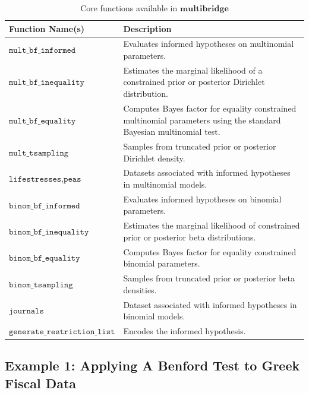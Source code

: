 \documentclass[
  english,
  man,floatsintext]{apa6}
\begin{document}
\begin{table}
\caption {Core functions available in $\textbf{multibridge}$}
\label{table:core_functions}
\begin{center}
\begin{tabular}{p{5.5cm}p{10.5cm}}
        \toprule
Function Name(s) & Description \\\midrule
$\texttt{mult\_bf\_informed}$ & Evaluates informed hypotheses on multinomial parameters.  \\
$\texttt{mult\_bf\_inequality}$ & Estimates the marginal likelihood of a constrained prior or posterior Dirichlet distribution.  \\
$\texttt{mult\_bf\_equality}$ & Computes Bayes factor for equality constrained multinomial parameters using the standard Bayesian multinomial test.  \\
$\texttt{mult\_tsampling}$ & Samples from truncated prior or posterior Dirichlet density.\\
$ \texttt{lifestresses}, \texttt{peas}$ & Datasets associated with informed hypotheses in multinomial models.\\\midrule
$\texttt{binom\_bf\_informed}$ & Evaluates informed hypotheses on binomial parameters.  \\
$\texttt{binom\_bf\_inequality}$ & Estimates the marginal likelihood of constrained prior or posterior beta distributions.\\
$\texttt{binom\_bf\_equality}$ & Computes Bayes factor for equality constrained binomial parameters.  \\
$\texttt{binom\_tsampling}$ & Samples from truncated prior or posterior beta densities.\\
$ \texttt{journals}$ & Dataset associated with informed hypotheses in binomial models.\\\midrule
$ \texttt{generate\_restriction\_list}$ & Encodes the informed hypothesis.\\
\bottomrule
\end{tabular}
\end{center}
\end{table}

\hypertarget{example-1-applying-a-benford-test-to-greek-fiscal-data}{%
\subsection{Example 1: Applying A Benford Test to Greek Fiscal Data}\label{example-1-applying-a-benford-test-to-greek-fiscal-data}}
\end{document}
